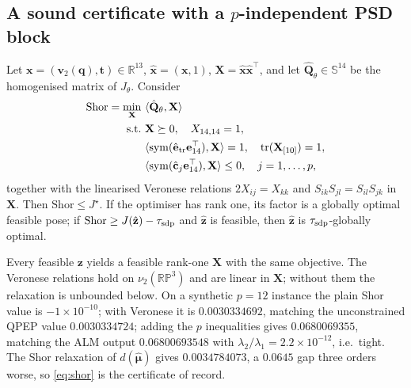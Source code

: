 \subsection{A sound certificate with a $p$-independent PSD block}\label{sec:cert}
\begin{lemma}\label{lem:cert}
Let $\mathbf x=(\mathbf v_2(\mathbf q),\mathbf t)\in\mathbb{R}^{13}$, $\hat{\mathbf x}=(\mathbf x,1)$, $\mathbf X=\hat{\mathbf x}\hat{\mathbf x}^\top$, and let $\hat{\mathbf Q}_\theta\in\mathbb{S}^{14}$ be the homogenised matrix of $J_\theta$. Consider
\begin{equation}
\begin{aligned}
\mathrm{Shor}=\min_{\mathbf X}\ &\langle\hat{\mathbf Q}_\theta,\mathbf X\rangle\\
\text{s.t.}\ &\mathbf X\succeq0,\quad X_{14,14}=1,\\
&\langle\operatorname{sym}(\hat{\mathbf e}_{\rm tr}\mathbf e_{14}^\top),\mathbf X\rangle=1,\quad \operatorname{tr}(\mathbf X_{[10]})=1,\\
&\langle\operatorname{sym}(\hat{\mathbf c}_j\mathbf e_{14}^\top),\mathbf X\rangle\le0,\quad j=1,\dots,p,
\end{aligned}
\label{eq:shor}
\end{equation}
together with the linearised Veronese relations $2X_{ij}=X_{kk}$ and $S_{ik}S_{jl}=S_{il}S_{jk}$ in $\mathbf X$. Then $\mathrm{Shor}\le J^\star$. If the optimiser has rank one, its factor is a globally optimal feasible pose; if $\mathrm{Shor}\ge J(\hat{\mathbf z})-\tau_{\rm sdp}$ and $\hat{\mathbf z}$ is feasible, then $\hat{\mathbf z}$ is $\tau_{\rm sdp}$-globally optimal.
\end{lemma}
Every feasible $\mathbf z$ yields a feasible rank-one $\mathbf X$ with the same objective. The Veronese relations hold on $\nu_2(\mathbb{RP}^3)$ and are linear in $\mathbf X$; without them the relaxation is unbounded below. On a synthetic $p=12$ instance the plain Shor value is $-1\times10^{-10}$; with Veronese it is $0.0030334692$, matching the unconstrained QPEP value $0.0030334724$; adding the $p$ inequalities gives $\mathbf{0.0680069355}$, matching the ALM output $0.06800693548$ with $\lambda_2/\lambda_1=2.2\times10^{-12}$, i.e.\ tight. The Shor relaxation of $d(\hat{\boldsymbol\mu})$ gives $0.0034784073$, a $0.0645$ gap three orders worse, so \eqref{eq:shor} is the certificate of record.

